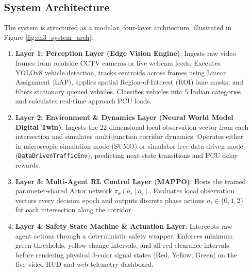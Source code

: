 \documentclass[12pt,a4paper,oneside]{report}
\begin{document}
\subsection{System Architecture}
The system is structured as a modular, four-layer architecture, illustrated in Figure \ref{fig:ch3_system_arch}:
\begin{enumerate}
    \item \textbf{Layer 1: Perception Layer (Edge Vision Engine)}: Ingests raw video frames from roadside CCTV cameras or live webcam feeds. Executes YOLOv8 vehicle detection, tracks centroids across frames using Linear Assignment (LAP), applies spatial Region-of-Interest (ROI) lane masks, and filters stationary queued vehicles. Classifies vehicles into 5 Indian categories and calculates real-time approach PCU loads.
    \item \textbf{Layer 2: Environment \& Dynamics Layer (Neural World Model Digital Twin)}: Ingests the 22-dimensional local observation vector from each intersection and simulates multi-junction corridor dynamics. Operates either in microscopic simulation mode (SUMO) or simulator-free data-driven mode (\texttt{DataDrivenTrafficEnv}), predicting next-state transitions and PCU delay rewards.
    \item \textbf{Layer 3: Multi-Agent RL Control Layer (MAPPO)}: Hosts the trained parameter-shared Actor network $\pi_\theta(a_i \mid o_i)$. Evaluates local observation vectors every decision epoch and outputs discrete phase actions $a_i \in \{0, 1, 2\}$ for each intersection along the corridor.
    \item \textbf{Layer 4: Safety State Machine \& Actuation Layer}: Intercepts raw agent actions through a deterministic safety wrapper. Enforces minimum green thresholds, yellow change intervals, and all-red clearance intervals before rendering physical 3-color signal states (Red, Yellow, Green) on the live video HUD and web telemetry dashboard.
\end{enumerate}
\end{document}
